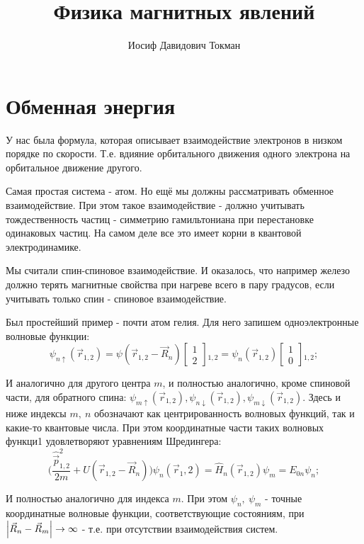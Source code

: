 \documentclass[a4paper, 14pt, russian]{article}
\title{Физика магнитных явлений}
\author{Иосиф Давидович Токман}
\date{}
\newcommand{\be}{\begin{equation}}
\newcommand{\ee}{\end{equation}}
\begin{document}
	\maketitle

	\section{Обменная энергия}

	У нас была формула, которая описывает взаимодействие электронов в низком порядке
	по скорости. Т.е. вдияние орбитального движения одного электрона на орбитальное
	движение другого.

	Самая простая система - атом. Но ещё мы должны рассматривать обменное взаимодействие.
	При этом такое взаимодействие - должно учитывать тождественность частиц - симметрию
	гамильтониана при перестановке одинаковых частиц. На самом деле все это имеет корни 
	в квантовой электродинамике.

	Мы считали спин-спиновое взаимодействие. И оказалось, что например железо должно терять
	магнитные свойства при нагреве всего в пару градусов, если учитывать только спин - 
	спиновое взаимодействие.

	Был простейший пример - почти атом гелия. Для него запишем одноэлектронные волновые 
	функции:
	\be
		\psi_{n\uparrow}(\vec{r}_{1,2}) = \psi(\vec{r}_{1,2} - \vec{R}_n)
			\begin{bmatrix}1 \\ 2\end{bmatrix}{}_{1,2} = \psi_{n}(\vec{r}_{1,2}) 
			\begin{bmatrix}1 \\ 0\end{bmatrix}{}_{1,2};
	\ee

	И аналогично для другого центра $m$, и полностью аналогично, кроме спиновой части, 
	для обратного спина: $\psi_{m\uparrow}(\vec{r}_{1,2}), \psi_{n\downarrow}(\vec{r}_{1,2}),
	\psi_{m\downarrow}(\vec{r}_{1,2})$. Здесь и ниже индексы $m,~n$
	обозначают как центрированность волновых функций, так и какие-то квантовые числа.
	При этом координатные части таких волновых функци1 удовлетворяют уравнениям Шредингера:
	\be
		\big(\frac{\hat{\vec p}^2_{1,2}}{2m} + U(\vec{r}_{1,2} - \vec{R}_n)\big) 
			\psi_n(\vec{r}_1,2) = \hat{H}_n (\vec{r}_{1,2}) \psi_m = E_{0n} \psi_n;
	\ee

	И полностью аналогично для индекса $m$. При этом $\psi_n,~\psi_m$ - точные
	координатные волновые функции, соответствующие состояниям, при 
	$\abs{\vec{R}_n - \vec{R}_m} \rightarrow \infty$ - т.е. при отсутствии взаимодействия
	систем.
\end{document}
